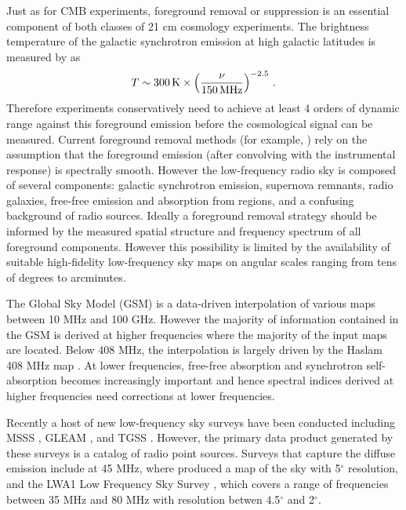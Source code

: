 \documentclass[twocolumn]{aastex61}
\begin{document}
Just as for CMB experiments, foreground removal or suppression is an essential component of both
classes of 21 cm cosmology experiments. The brightness temperature of the galactic synchrotron
emission at high galactic latitudes is measured by \citet{2008AJ....136..641R} as
\begin{equation}
    T \sim 300\,{\rm K} \times \left(\frac{\nu}{150\,{\rm MHz}}\right)^{-2.5}\,.
\end{equation}
Therefore experiments conservatively need to achieve at least 4 orders of dynamic range against this
foreground emission before the cosmological signal can be measured. Current foreground removal
methods (for example, \citealt{2012ApJ...756..165P}) rely on the assumption that the foreground
emission (after convolving with the instrumental response) is spectrally smooth. However the
low-frequency radio sky is composed of several components: galactic synchrotron emission, supernova
remnants, radio galaxies, free-free emission and absorption from  regions, and a confusing
background of radio sources.  Ideally a foreground removal strategy should be informed by the
measured spatial structure and frequency spectrum of all foreground components.  However this
possibility is limited by the availability of suitable high-fidelity low-frequency sky maps on
angular scales ranging from tens of degrees to arcminutes.

The Global Sky Model (GSM) \citep{2008MNRAS.388..247D, 2017MNRAS.464.3486Z} is a data-driven
interpolation of various maps between 10 MHz and 100 GHz. However the majority of information
contained in the GSM is derived at higher frequencies where the majority of the input maps are
located.  Below 408 MHz, the interpolation is largely driven by the Haslam 408 MHz map
\citep{1981A&A...100..209H, 1982A&AS...47....1H}.  At lower frequencies, free-free absorption and
synchrotron self-absorption becomes increasingly important and hence spectral indices derived at
higher frequencies need corrections at lower frequencies.

Recently a host of new low-frequency sky surveys have been conducted including MSSS
\citep{2015A&A...582A.123H}, GLEAM \citep{2015PASA...32...25W}, and TGSS
\citep{2017A&A...598A..78I}. However, the primary data product generated by these surveys is a
catalog of radio point sources. Surveys that capture the diffuse emission include at 45 MHz, where
\citet{2011A&A...525A.138G} produced a map of the sky with 5$^\circ$ resolution, and the LWA1 Low
Frequency Sky Survey \citep{2017MNRAS.469.4537D}, which covers a range of frequencies between 35 MHz
and 80 MHz with resolution betwen 4.5$^\circ$ and 2$^\circ$.
\end{document}
